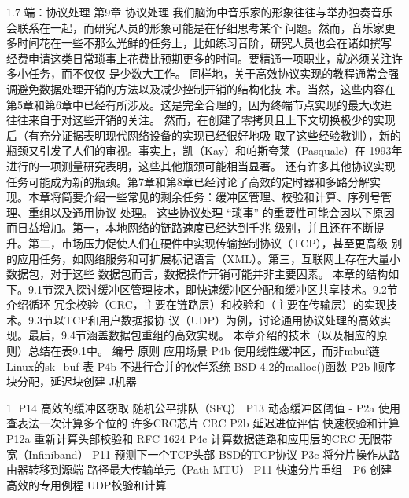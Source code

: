 
1.7 端：协议处理
第9章 协议处理
我们脑海中音乐家的形象往往与举办独奏音乐会联系在一起，而研究人员的形象可能是在仔细思考某个
问题。然而，音乐家更多时间花在一些不那么光鲜的任务上，比如练习音阶，研究人员也会在诸如撰写
经费申请这类日常琐事上花费比预期更多的时间。要精通一项职业，就必须关注许多小任务，而不仅仅
是少数大工作。
同样地，关于高效协议实现的教程通常会强调避免数据处理开销的方法以及减少控制开销的结构化技
术。当然，这些内容在第5章和第6章中已经有所涉及。这是完全合理的，因为终端节点实现的最大改进
往往来自于对这些开销的关注。
然而，在创建了零拷贝且上下文切换极少的实现后（有充分证据表明现代网络设备的实现已经很好地吸
取了这些经验教训），新的瓶颈又引发了人们的审视。事实上，凯（Kay）和帕斯夸莱（Pasquale）在
1993年进行的一项测量研究表明，这些其他瓶颈可能相当显著。
还有许多其他协议实现任务可能成为新的瓶颈。第7章和第8章已经讨论了高效的定时器和多路分解实
现。本章将简要介绍一些常见的剩余任务：缓冲区管理、校验和计算、序列号管理、重组以及通用协议
处理。
这些协议处理 “琐事” 的重要性可能会因以下原因而日益增加。第一，本地网络的链路速度已经达到千兆
级别，并且还在不断提升。第二，市场压力促使人们在硬件中实现传输控制协议（TCP），甚至更高级
别的应用任务，如网络服务和可扩展标记语言（XML）。第三，互联网上存在大量小数据包，对于这些
数据包而言，数据操作开销可能并非主要因素。
本章的结构如下。9.1节深入探讨缓冲区管理技术，即快速缓冲区分配和缓冲区共享技术。9.2节介绍循环
冗余校验（CRC，主要在链路层）和校验和（主要在传输层）的实现技术。9.3节以TCP和用户数据报协
议（UDP）为例，讨论通用协议处理的高效实现。最后，9.4节涵盖数据包重组的高效实现。
本章介绍的技术（以及相应的原则）总结在表9.1中。
 编号               原则              应用场景
 P4b              使用线性缓冲区，而非mbuf链 Linux的sk_buf
                  表
 P4b              不进行合并的伙伴系统      BSD 4.2的malloc()函数
 P2b              顺序块分配，延迟块创建     J机器

                                                   1
P14                高效的缓冲区窃取       随机公平排队（SFQ）
P13                动态缓冲区阈值        -
P2a                使用查表法一次计算多个位的 许多CRC芯片
                   CRC
P2b                延迟进位评估         快速校验和计算
P12a               重新计算头部校验和      RFC 1624
P4c                计算数据链路和应用层的CRC 无限带宽（Infiniband）
P11                预测下一个TCP头部     BSD的TCP协议
P3c                将分片操作从路由器转移到源端 路径最大传输单元（Path
                                  MTU）
P11                快速分片重组         -
P6                 创建高效的专用例程      UDP校验和计算

